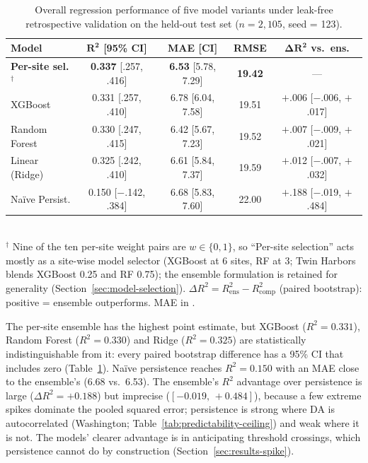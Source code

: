 \documentclass[toxins,article,submit,moreauthors]{Definitions/mdpi}
\begin{document}
\begin{table}[H]
\caption{Overall regression performance of five model variants under leak-free retrospective validation on the held-out test set ($n = 2{,}105$, seed = 123).}
\label{tab:model-comparison}
\centering\scriptsize
\begin{tabular*}{\linewidth}{@{\extracolsep{\fill}}lcccc}
\toprule
\textbf{Model} & $\boldsymbol{R^2}$ \textbf{[95\% CI]} & \textbf{MAE [CI]} & \textbf{RMSE} & $\boldsymbol{\Delta R^2}$ \textbf{vs.\ ens.} \\
\midrule
\textbf{Per-site sel.}$^{\dagger}$ & \textbf{0.337} [.257, .416] & \textbf{6.53} [5.78, 7.29] & \textbf{19.42} & --- \\
XGBoost          & 0.331 [.257, .410] & 6.78 [6.04, 7.58] & 19.51 & $+$.006 [$-$.006, $+$.017] \\
Random Forest    & 0.330 [.247, .415] & 6.42 [5.67, 7.23] & 19.52 & $+$.007 [$-$.009, $+$.021] \\
Linear (Ridge)   & 0.325 [.242, .410] & 6.61 [5.84, 7.37] & 19.59 & $+$.012 [$-$.007, $+$.032] \\
Na\"ive Persist. & 0.150 [$-$.142, .384] & 6.68 [5.83, 7.60] & 22.00 & $+$.188 [$-$.019, $+$.484] \\
\bottomrule
\end{tabular*}
\vspace{0.3em}\\
\footnotesize{$^\dagger$ Nine of the ten per-site weight pairs are $w \in \{0,1\}$, so ``Per-site selection'' acts mostly as a site-wise model selector (XGBoost at 6 sites, RF at 3; Twin Harbors blends XGBoost 0.25 and RF 0.75); the ensemble formulation is retained for generality (Section~\ref{sec:model-selection}). $\Delta R^2 = R^2_{\text{ens}} - R^2_{\text{comp}}$ (paired bootstrap): positive = ensemble outperforms. MAE in \si{\microgrampeg}.}
\end{table}

The per-site ensemble has the highest point estimate, but XGBoost ($R^2 = 0.331$), Random Forest ($R^2 = 0.330$) and Ridge ($R^2 = 0.325$) are statistically indistinguishable from it: every paired bootstrap difference has a 95\% CI that includes zero (Table~\ref{tab:model-comparison}). Na\"ive persistence reaches $R^2 = 0.150$ with an MAE close to the ensemble's (6.68 vs.\ \SI{6.53}{\microgrampeg}). The ensemble's $R^2$ advantage over persistence is large ($\Delta R^2 = +0.188$) but imprecise ($[-0.019,\, +0.484]$), because a few extreme spikes dominate the pooled squared error; persistence is strong where DA is autocorrelated (Washington; Table~\ref{tab:predictability-ceiling}) and weak where it is not. The models' clearer advantage is in anticipating threshold crossings, which persistence cannot do by construction (Section~\ref{sec:results-spike}).
\end{document}
